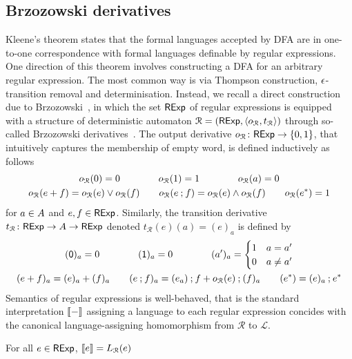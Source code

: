 \subsection{Brzozowski derivatives}\label{c2:subsec:brzozowski_derivatives}
Kleene's theorem states that the formal languages accepted by DFA are in one-to-one correspondence with formal languages definable by regular expressions. One direction of this theorem involves constructing a \textsf{DFA} for an arbitrary regular expression. The most common way is via Thompson construction, $\epsilon$-transition removal and determinisation. Instead, we recall a direct construction due to Brzozowski~\cite{Brzozowski:1964:Expressions}, in which the set $\mathsf{RExp}$ of regular expressions is equipped with a structure of deterministic automaton $\mathcal{R} = (\mathsf{RExp}, \langle o_{\mathcal{R}}, t_{\mathcal{R}} \rangle)$ through so-called Brzozowski derivatives~\cite{Brzozowski:1964:Expressions}. The output derivative $o_{\mathcal{R}} \colon \mathsf{RExp} \to \{0, 1\}$, that intuitively captures the membership of empty word, is defined inductively as follows
\begin{gather*}
    o_{\mathcal{R}}(0) = 0 \qquad\qquad o_{\mathcal{R}}(1) = 1 \qquad\qquad o_{\mathcal{R}}(a) = 0 \\ o_{\mathcal{R}}(e + f) = o_{\mathcal{R}}(e) \vee o_{\mathcal{R}}(f) \qquad
    o_{\mathcal{R}}(e \mathbin{;} f) = o_{\mathcal{R}}(e) \wedge o_{\mathcal{R}}(f) \qquad o_{\mathcal{R}}(e^{\ast}) = 1
\end{gather*}
for $a \in {A}$ and $e,f \in \mathsf{RExp}$. Similarly, the transition derivative $t_{\mathcal{R}} \colon \mathsf{RExp} \to {A} \to \mathsf{RExp}$ denoted $t_{\mathcal{R}} (e)(a) = (e)_a$ is defined by
\begin{gather*}
    (\mathsf{0})_a = 0 \qquad\qquad (\mathsf{1})_a = 0 \qquad\qquad (a')_a = \begin{cases}
        1 & a = a'\\ 0 & a \neq a'  \end{cases}\\
    (e + f)_a = (e)_a + (f)_a \qquad
    (e \mathbin{;} f)_a = (e_a) \mathbin{;} f + o_{\mathcal{R}}(e) \mathbin{;} (f)_a \qquad (e^{\ast}) = (e)_a \mathbin{;} e^{\ast}
\end{gather*}
Semantics of regular expressions is well-behaved, that is the standard interpretation $\left\llbracket{-}\right\rrbracket$ assigning a language to each regular expression concides with the canonical language-assigning homomorphism from $\mathcal{R}$ to $\mathcal{L}$.
\begin{lemma}\label{c2:lem:adequacy}
    For all $e \in \mathsf{RExp}$, $\left\llbracket{e}\right\rrbracket = L_{\mathcal{R}}(e)$
\end{lemma}
